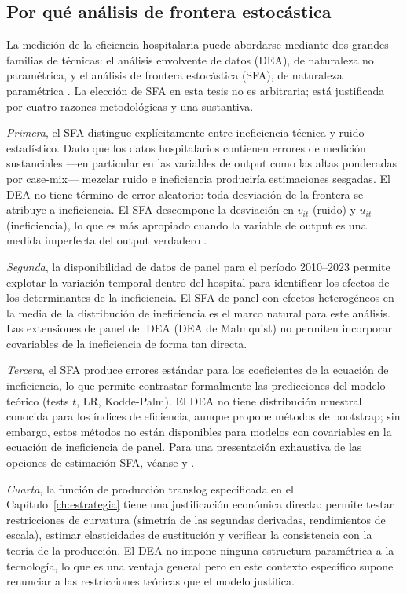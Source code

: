 \subsection{Por qué análisis de frontera estocástica}

La medición de la eficiencia hospitalaria puede abordarse mediante dos grandes familias de técnicas: el análisis envolvente de datos (DEA), de naturaleza no paramétrica, y el análisis de frontera estocástica (SFA), de naturaleza paramétrica \citep{coelli2005}. La elección de SFA en esta tesis no es arbitraria; está justificada por cuatro razones metodológicas y una sustantiva.

\textit{Primera}, el SFA distingue explícitamente entre ineficiencia técnica y ruido estadístico. Dado que los datos hospitalarios contienen errores de medición sustanciales ---en particular en las variables de output como las altas ponderadas por case-mix--- mezclar ruido e ineficiencia produciría estimaciones sesgadas. El DEA no tiene término de error aleatorio: toda desviación de la frontera se atribuye a ineficiencia. El SFA descompone la desviación en $v_{it}$ (ruido) y $u_{it}$ (ineficiencia), lo que es más apropiado cuando la variable de output es una medida imperfecta del output verdadero \citep{aigner1977,meeusen1977,kumbhakar2000}.

\textit{Segunda}, la disponibilidad de datos de panel para el período 2010--2023 permite explotar la variación temporal dentro del hospital para identificar los efectos de los determinantes de la ineficiencia. El SFA de panel con efectos heterogéneos en la media de la distribución de ineficiencia \citep{battese1995,wang2002} es el marco natural para este análisis. Las extensiones de panel del DEA (DEA de Malmquist) no permiten incorporar covariables de la ineficiencia de forma tan directa.

\textit{Tercera}, el SFA produce errores estándar para los coeficientes de la ecuación de ineficiencia, lo que permite contrastar formalmente las predicciones del modelo teórico (tests $t$, LR, Kodde-Palm). El DEA no tiene distribución muestral conocida para los índices de eficiencia, aunque \citet{simar2007} propone métodos de bootstrap; sin embargo, estos métodos no están disponibles para modelos con covariables en la ecuación de ineficiencia de panel. Para una presentación exhaustiva de las opciones de estimación SFA, véanse \citet{kumbhakar2000} y \citet{greene2008}.

\textit{Cuarta}, la función de producción translog especificada en el Capítulo~\ref{ch:estrategia} tiene una justificación económica directa: permite testar restricciones de curvatura (simetría de las segundas derivadas, rendimientos de escala), estimar elasticidades de sustitución y verificar la consistencia con la teoría de la producción. El DEA no impone ninguna estructura paramétrica a la tecnología, lo que es una ventaja general pero en este contexto específico supone renunciar a las restricciones teóricas que el modelo justifica.

